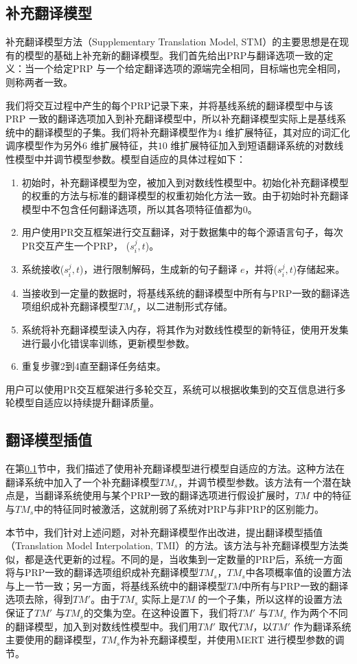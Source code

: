 \documentclass[master, winfont]{njuthesis}
\begin{document}
\subsection{补充翻译模型}
\label{section:Supplementary}
补充翻译模型方法（Supplementary Translation Model, STM）的主要思想是在现有的模型的基础上补充新的翻译模型。我们首先给出PRP与翻译选项一致的定义：当一个给定PRP 与一个给定翻译选项的源端完全相同，目标端也完全相同，则称两者一致。

我们将交互过程中产生的每个PRP记录下来，并将基线系统的翻译模型中与该PRP 一致的翻译选项加入到补充翻译模型中，所以补充翻译模型实际上是基线系统中的翻译模型的子集。我们将补充翻译模型作为$4$ 维扩展特征，其对应的词汇化调序模型作为另外$6$ 维扩展特征，共$10$ 维扩展特征加入到短语翻译系统的对数线性模型中并调节模型参数。模型自适应的具体过程如下：
\begin{enumerate}
  \item 初始时，补充翻译模型为空，被加入到对数线性模型中。初始化补充翻译模型的权重的方法与标准的翻译模型的权重初始化方法一致。由于初始时补充翻译模型中不包含任何翻译选项，所以其各项特征值都为0。
  \item 用户使用PR交互框架进行交互翻译，对于数据集中的每个源语言句子，每次PR交互产生一个PRP， ($s_i^j, t$)。
  \item 系统接收($s_i^j, t$)，进行限制解码，生成新的句子翻译 $e$，并将($s_i^j, t$)存储起来。
  \item 当接收到一定量的数据时，将基线系统的翻译模型中所有与PRP一致的翻译选项组织成补充翻译模型$TM_s$，以二进制形式存储。
  \item 系统将补充翻译模型读入内存，将其作为对数线性模型的新特征，使用开发集进行最小化错误率训练，更新模型参数。
  \item 重复步骤2到4直至翻译任务结束。
\end{enumerate}

用户可以使用PR交互框架进行多轮交互，系统可以根据收集到的交互信息进行多轮模型自适应以持续提升翻译质量。

\subsection{翻译模型插值}
\label{section:interporlation}
在第\ref{section:Supplementary}节中，我们描述了使用补充翻译模型进行模型自适应的方法。这种方法在翻译系统中加入了一个补充翻译模型$TM_s$，并调节模型参数。该方法有一个潜在缺点是，当翻译系统使用与某个PRP一致的翻译选项进行假设扩展时，$TM$ 中的特征与$TM_s$中的特征同时被激活，这就削弱了系统对PRP与非PRP的区别能力。

本节中，我们针对上述问题，对补充翻译模型作出改进，提出翻译模型插值（Translation Model Interpolation, TMI）的方法。该方法与补充翻译模型方法类似，都是迭代更新的过程。不同的是，当收集到一定数量的PRP后，系统一方面将与PRP一致的翻译选项组织成补充翻译模型$TM_s$，$TM_s$中各项概率值的设置方法与上一节一致；另一方面，将基线系统中的翻译模型$TM$中所有与PRP一致的翻译选项去除，得到$TM'$。由于$TM_s$ 实际上是$TM$ 的一个子集，所以这样的设置方法保证了$TM'$ 与$TM_s$的交集为空。在这种设置下，我们将$TM'$ 与$TM_s$ 作为两个不同的翻译模型，加入到对数线性模型中。我们用$TM'$ 取代$TM$，以$TM'$ 作为翻译系统主要使用的翻译模型，$TM_s$作为补充翻译模型，并使用MERT 进行模型参数的调节。
\end{document}
